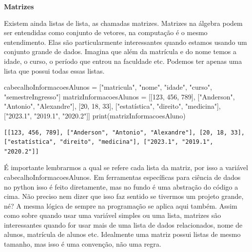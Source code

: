 \documentclass[
  letterpaper,
  DIV=11,
  numbers=noendperiod]{scrreprt}
\newenvironment{Shaded}{\begin{snugshade}}{\end{snugshade}}
\newcommand{\BuiltInTok}[1]{\textcolor[rgb]{0.00,0.23,0.31}{#1}}
\newcommand{\DecValTok}[1]{\textcolor[rgb]{0.68,0.00,0.00}{#1}}
\newcommand{\NormalTok}[1]{\textcolor[rgb]{0.00,0.23,0.31}{#1}}
\newcommand{\OperatorTok}[1]{\textcolor[rgb]{0.37,0.37,0.37}{#1}}
\newcommand{\StringTok}[1]{\textcolor[rgb]{0.13,0.47,0.30}{#1}}
\begin{document}
\textbf{Matrizes}

Existem ainda listas de lista, as chamadas matrizes. Matrizes na álgebra
podem ser entendidas como conjunto de vetores, na computação é o mesmo
entendimento. Elas são particularmente interessantes quando estamos
usando um conjunto grande de dados. Imagina que além da matrícula e do
nome temos a idade, o curso, o período que entrou na faculdade etc.
Podemos ter apenas uma lista que possui todas essas listas.

\begin{Shaded}
\begin{Highlighting}[]
\NormalTok{cabecalhoInformacoesAlunos }\OperatorTok{=}\NormalTok{ [}\StringTok{"matricula"}\NormalTok{, }\StringTok{"nome"}\NormalTok{, }\StringTok{"idade"}\NormalTok{, }\StringTok{"curso"}\NormalTok{, }\StringTok{"semestreIngresso"}\NormalTok{]}
\NormalTok{matrizInformacoesAlunos }\OperatorTok{=}\NormalTok{ [[}\DecValTok{123}\NormalTok{, }\DecValTok{456}\NormalTok{, }\DecValTok{789}\NormalTok{], [}\StringTok{"Anderson"}\NormalTok{, }\StringTok{"Antonio"}\NormalTok{, }\StringTok{"Alexandre"}\NormalTok{], [}\DecValTok{20}\NormalTok{, }\DecValTok{18}\NormalTok{, }\DecValTok{33}\NormalTok{], [}\StringTok{"estatística"}\NormalTok{, }\StringTok{"direito"}\NormalTok{, }\StringTok{"medicina"}\NormalTok{], [}\StringTok{"2023.1"}\NormalTok{, }\StringTok{"2019.1"}\NormalTok{, }\StringTok{"2020.2"}\NormalTok{]]}
\BuiltInTok{print}\NormalTok{(matrizInformacoesAluno)}
\end{Highlighting}
\end{Shaded}

\begin{tcolorbox}[enhanced jigsaw, breakable, leftrule=.75mm, left=2mm, opacityback=0, bottomrule=.15mm, toprule=.15mm, rightrule=.15mm, arc=.35mm, colback=white]

\begin{verbatim}
[[123, 456, 789], ["Anderson", "Antonio", "Alexandre"], [20, 18, 33], ["estatística", "direito", "medicina"], ["2023.1", "2019.1", "2020.2"]]
\end{verbatim}

\end{tcolorbox}

É importante lembrarmos a qual se refere cada lista da matriz, por isso
a variável cabecalhoInformacoesAlunos. Em ferramentas específicas para
ciência de dados no python isso é feito diretamente, mas no fundo é uma
abstração do código a cima. Não preciso nem dizer que isso faz sentido
se tivermos um projeto grande, né? A mesma lógica de sempre na
programação se aplica aqui também. Assim como sobre quando usar uma
variável simples ou uma lista, matrizes são interessantes quando for
usar mais de uma lista de dados relacionados, nome de alunos, matrícula
de alunos etc. Idealmente uma matriz possui listas de mesmo tamanho, mas
isso é uma convenção, não uma regra.
\end{document}
